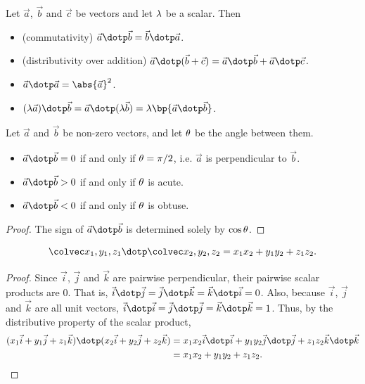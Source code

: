 \begin{fact}
    Let $\vec a$, $\vec b$ and $\vec c$ be vectors and let $\lambda$ be a scalar. Then
    \begin{itemize}
        \item (commutativity) $\vec a \dotp \vec b = \vec b \dotp \vec a$.
        \item (distributivity over addition) $\vec a \dotp (\vec b + \vec c) = \vec a \dotp \vec b + \vec a \dotp \vec c$.
        \item $\vec a \dotp \vec a = \abs{\vec a}^2$.
        \item $(\l \vec a) \dotp \vec b = \vec a \dotp (\l \vec b) = \l \bp{\vec a \dotp \vec b}$.
    \end{itemize}
\end{fact}

\begin{proposition}
    Let $\vec a$ and $\vec b$ be non-zero vectors, and let $\theta$ be the angle between them.
    \begin{itemize}
        \item $\vec a \dotp \vec b = 0$ if and only if $\theta = \pi/2$, i.e. $\vec a$ is perpendicular to $\vec b$.
        \item $\vec a \dotp \vec b > 0$ if and only if $\theta$ is acute.
        \item $\vec a \dotp \vec b < 0$ if and only if $\theta$ is obtuse.
    \end{itemize}
\end{proposition}
\begin{proof}
    The sign of $\vec a \dotp \vec b$ is determined solely by $\cos \theta$.
\end{proof}

\begin{proposition}
    \[\cveciii{x_1}{y_1}{z_1} \dotp \cveciii{x_2}{y_2}{z_2} = x_1 x_2 + y_1 y_2 + z_1 z_2.\]
\end{proposition}
\begin{proof}
    Since $\vec i$, $\vec j$ and $\vec k$ are pairwise perpendicular, their pairwise scalar products are 0. That is, $\vec i \dotp \vec j = \vec j \dotp \vec k = \vec k \dotp \vec i = 0$. Also, because $\vec i$, $\vec j$ and $\vec k$ are all unit vectors, $\vec i \dotp \vec i = \vec j \dotp \vec j = \vec k \dotp \vec k = 1$. Thus, by the distributive property of the scalar product,
    \begin{align*}
        (x_1 \vec i + y_1 \vec j + z_1 \vec k) \dotp (x_2 \vec i + y_2 \vec j + z_2 \vec k) &= x_1 x_2 \vec i \dotp \vec i + y_1 y_2 \vec j \dotp \vec j + z_1 z_2 \vec k \dotp \vec k\\
        &= x_1 x_2 + y_1 y_2 + z_1 z_2.
    \end{align*}
\end{proof}

